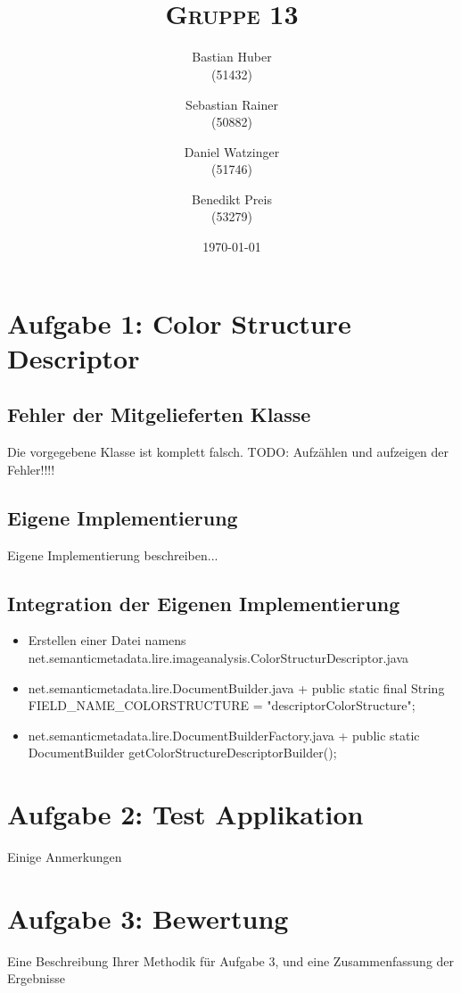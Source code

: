 \documentclass{article}
\author{Bastian Huber\\(51432) \and Sebastian Rainer\\(50882) \and Daniel Watzinger\\(51746) \and Benedikt Preis \\(53279)}
\title{\textbf{\huge{\thetitle}}\\\large\textsc{Gruppe 13}}
\date{\today}
\newcommand{\mysection}[1]{\section*{#1} \setcounter{subsection}{0}}
\begin{document}
\hyphenation{}

\maketitle

\pagestyle{fancy}


\mysection{Aufgabe 1: Color Structure Descriptor}
  \subsection{Fehler der Mitgelieferten Klasse}
    Die vorgegebene Klasse ist komplett falsch. TODO: Aufzählen und aufzeigen der Fehler!!!!
  \subsection{Eigene Implementierung}
    Eigene Implementierung beschreiben...
  \subsection{Integration der Eigenen Implementierung}
    \begin{itemize}
      \item Erstellen einer Datei namens net.semanticmetadata.lire.imageanalysis.ColorStructurDescriptor.java
      \item net.semanticmetadata.lire.DocumentBuilder.java + public static final String FIELD\_NAME\_COLORSTRUCTURE = "descriptorColorStructure";
      \item net.semanticmetadata.lire.DocumentBuilderFactory.java + public static DocumentBuilder getColorStructureDescriptorBuilder();
    \end{itemize}
    
    

\mysection{Aufgabe 2: Test Applikation}
  Einige Anmerkungen
  
\mysection{Aufgabe 3: Bewertung}
Eine Beschreibung Ihrer Methodik für Aufgabe 3, und eine Zusammenfassung der Ergebnisse
\end{document}
